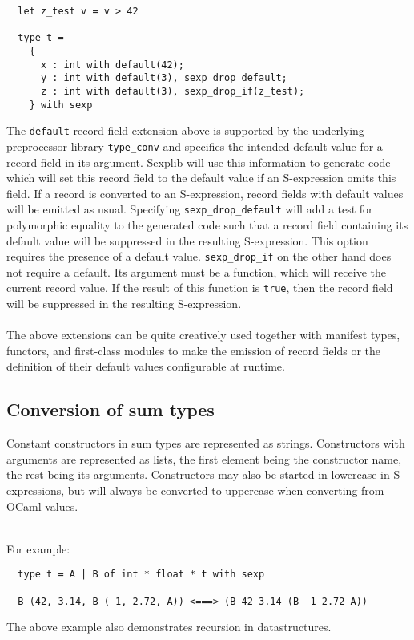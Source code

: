 \documentclass[a4paper]{article}
\begin{document}
\begin{verbatim}
  let z_test v = v > 42

  type t =
    {
      x : int with default(42);
      y : int with default(3), sexp_drop_default;
      z : int with default(3), sexp_drop_if(z_test);
    } with sexp
\end{verbatim}

\noindent The \verb=default= record field extension above is supported by the
underlying preprocessor library \verb=type_conv= and specifies the intended
default value for a record field in its argument.  Sexplib will use this
information to generate code which will set this record field to the default
value if an S-expression omits this field.  If a record is converted to an
S-expression, record fields with default values will be emitted as usual.
Specifying \verb=sexp_drop_default= will add a test for polymorphic equality
to the generated code such that a record field containing its default value
will be suppressed in the resulting S-expression.  This option requires the
presence of a default value.  \verb=sexp_drop_if= on the other hand does
not require a default.  Its argument must be a function, which will receive
the current record value.  If the result of this function is \verb=true=,
then the record field will be suppressed in the resulting S-expression.\\
\\
The above extensions can be quite creatively used together with manifest
types, functors, and first-class modules to make the emission of record
fields or the definition of their default values configurable at runtime.

\subsection{Conversion of sum types}

Constant constructors in sum types are represented as strings.
Constructors with arguments are represented as lists, the first element
being the constructor name, the rest being its arguments.  Constructors
may also be started in lowercase in S-expressions, but will always be
converted to uppercase when converting from OCaml-values.\\
\\
{\samepage
\noindent For example:

\begin{verbatim}
  type t = A | B of int * float * t with sexp

  B (42, 3.14, B (-1, 2.72, A)) <===> (B 42 3.14 (B -1 2.72 A))
\end{verbatim}

\noindent The above example also demonstrates recursion in datastructures.
}
\end{document}
